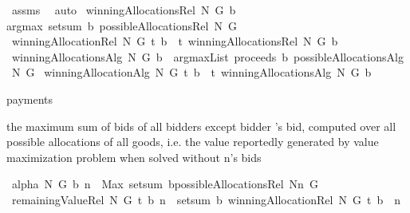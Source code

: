 \begin{isabellebody}
%
\isadelimproof
%
\endisadelimproof
%
\isatagproof
{}\isamarkupfalse%
\ assms\ \isamarkupfalse%
\ auto%
\endisatagproof
{\isafoldproof}%
%
\isadelimproof
%
\endisadelimproof
%
\isamarkuptrue%
\isamarkupfalse%
\ {\isachardoublequoteopen}winningAllocationsRel\ N\ G\ b\ {\isacharequal}{\isacharequal}\ \isanewline
argmax\ {\isacharparenleft}setsum\ b{\isacharparenright}\ {\isacharparenleft}possibleAllocationsRel\ N\ G{\isacharparenright}{\isachardoublequoteclose}\isanewline
\isanewline
{}\isamarkupfalse%
\ {\isachardoublequoteopen}winningAllocationRel\ N\ G\ t\ b\ {\isacharequal}{\isacharequal}\ t\ {\isacharparenleft}winningAllocationsRel\ N\ G\ b{\isacharparenright}{\isachardoublequoteclose}\isanewline
\isanewline
{}\isamarkupfalse%
\ {\isachardoublequoteopen}winningAllocationsAlg\ N\ G\ b\ {\isacharequal}{\isacharequal}\ argmaxList\ {\isacharparenleft}proceeds\ b{\isacharparenright}\ {\isacharparenleft}possibleAllocationsAlg{}\ N\ G{\isacharparenright}{\isachardoublequoteclose}\isanewline
\isanewline
{}\isamarkupfalse%
\ {\isachardoublequoteopen}winningAllocationAlg\ N\ G\ t\ b\ {\isacharequal}{\isacharequal}\ t\ {\isacharparenleft}winningAllocationsAlg\ N\ G\ b{\isacharparenright}{\isachardoublequoteclose}%
\begin{isamarkuptext}%
payments%
\end{isamarkuptext}%
\isamarkuptrue%
%
\begin{isamarkuptext}%
the maximum sum of bids of all bidders except bidder 's bid, computed over all possible allocations of all goods,
  i.e. the value reportedly generated by value maximization problem when solved without n's bids%
\end{isamarkuptext}%
\isamarkuptrue%
\isamarkupfalse%
\ {\isachardoublequoteopen}alpha\ N\ G\ b\ n\ {\isacharequal}{\isacharequal}\ Max\ {\isacharparenleft}{\isacharparenleft}setsum\ b{\isacharparenright}{\isacharbackquote}{\isacharparenleft}possibleAllocationsRel\ {\isacharparenleft}N{\isacharminus}{\isacharbraceleft}n{\isacharbraceright}{\isacharparenright}\ G{\isacharparenright}{\isacharparenright}{\isachardoublequoteclose}\isanewline
\isanewline
{}\isamarkupfalse%
\ {\isachardoublequoteopen}remainingValueRel\ N\ G\ t\ b\ n\ {\isacharequal}{\isacharequal}\ setsum\ b\ {\isacharparenleft}winningAllocationRel\ N\ G\ t\ b\ {\isacharminus}{\isacharminus}\ n{\isacharparenright}{\isachardoublequoteclose}\isanewline

\end{isabellebody}
